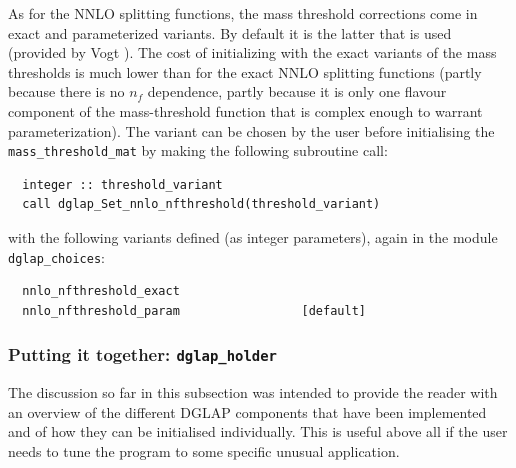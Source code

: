 \documentclass[12pt]{article}
\newcommand{\ttt}[1]{\texttt{#1}}
\begin{document}
As for the NNLO splitting functions, the mass threshold corrections
come in exact and parameterized variants. By default it is the latter
that is used (provided by Vogt \cite{VogtMTMParam}).  The cost of
initializing with the exact variants of the mass thresholds is much
lower than for the exact NNLO splitting functions (partly because
there is no $n_f$ dependence, partly because it is only one flavour
component of the mass-threshold function that is complex enough to
warrant parameterization). The variant can be chosen by the user
before initialising the \ttt{mass\_threshold\_mat} by making the
following subroutine call:
\begin{lstlisting}
  integer :: threshold_variant
  call dglap_Set_nnlo_nfthreshold(threshold_variant)
\end{lstlisting}
with the following variants defined (as integer parameters), again in
the module \ttt{dglap\_choices}:
\begin{lstlisting}
  nnlo_nfthreshold_exact
  nnlo_nfthreshold_param                 [default]
\end{lstlisting}


\subsubsection{Putting it together: \ttt{dglap\_holder}}

The discussion so far in this subsection was intended to provide the
reader with an overview of the different DGLAP components that have
been implemented and of how they can be initialised individually. This
is useful above all if the user needs to tune the program to some
specific unusual application.
\end{document}
